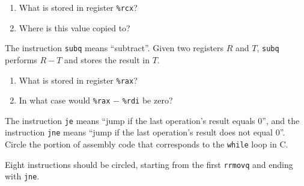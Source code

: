 \begin{enumerate}
\item What is stored in register \verb|%rcx|? 
\item Where is this value copied to? 
\end{enumerate}


\Q The instruction \verb|subq| means ``subtract''. Given two registers $R$ and $T$, \verb|subq| performs $R-T$ and stores the result in $T$.

\begin{enumerate}
\item What is stored in register \verb|%rax|? 
\item In what case would \verb|%rax| $-$ \verb|%rdi| be zero? 
\end{enumerate}


\Q The instruction \verb|je| means ``jump if the last operation's result equals 0'', and the instruction \verb|jne| means ``jump if the last operation's result does not equal 0''. Circle the portion of assembly code that corresponds to the \verb|while| loop in C.

\begin{answer}[2em]
Eight instructions should be circled, starting from the first {\tt rrmovq} and ending with {\tt jne}.
\end{answer}


%
